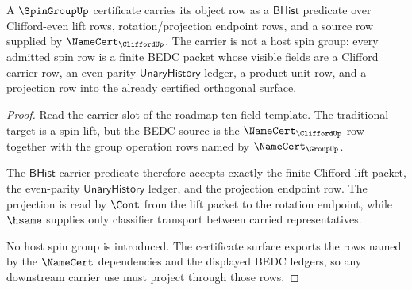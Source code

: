 \begin{theorem}\label{thm:spingroup-carrier-obligation}
A $\SpinGroupUp$ certificate carries its object row as a $\mathsf{BHist}$ predicate over Clifford-even lift rows, rotation/projection endpoint rows, and a source row supplied by $\NameCert_{\CliffordUp}$. The carrier is not a host spin group: every admitted spin row is a finite BEDC packet whose visible fields are a Clifford carrier row, an even-parity $\mathsf{UnaryHistory}$ ledger, a product-unit row, and a projection row into the already certified orthogonal surface.
\end{theorem}
\begin{proof}
Read the carrier slot of the roadmap ten-field template. The traditional target is a spin lift, but the BEDC source is the $\NameCert_{\CliffordUp}$ row together with the group operation rows named by $\NameCert_{\GroupUp}$.

The $\mathsf{BHist}$ carrier predicate therefore accepts exactly the finite Clifford lift packet, the even-parity $\mathsf{UnaryHistory}$ ledger, and the projection endpoint row. The projection is read by $\Cont$ from the lift packet to the rotation endpoint, while $\hsame$ supplies only classifier transport between carried representatives.

No host spin group is introduced. The certificate surface exports the rows named by the $\NameCert$ dependencies and the displayed BEDC ledgers, so any downstream carrier use must project through those rows.
\end{proof}

